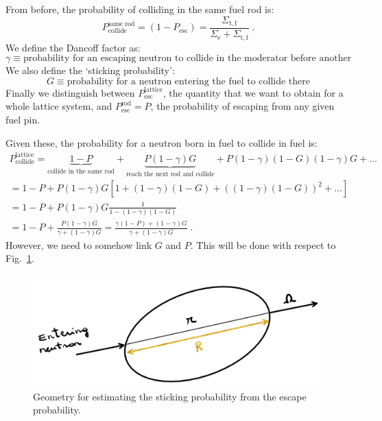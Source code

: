 From before, the probability of colliding in the same fuel rod is:
\begin{equation*}
    P^\text{same rod}_\mathrm{collide} = (1-P_\mathrm{esc}) = \frac{\Sigma_\mathrm{t,f}}{\Sigma_\mathrm{e} + \Sigma_\mathrm{t,f}}\;\mathrm{.}
\end{equation*}
We define the Dancoff factor as:
\begin{equation*}
    \gamma \equiv \text{probability for an escaping neutron to collide in the moderator before another fuel rod}
\end{equation*}
We also define the `sticking probability':
\begin{equation*}
    G \equiv \text{probability for a neutron entering the fuel to collide there}
\end{equation*}
Finally we distinguish between $P^\mathrm{lattice}_\mathrm{esc}$, the quantity that we want to obtain for a whole lattice system, and $P^\mathrm{rod}_\mathrm{esc} = P$, the probability of escaping from any given fuel pin.

Given these, the probability for a neutron born in fuel to collide in fuel is:
\begin{equation*}
\begin{split}
    P^\mathrm{lattice}_\mathrm{collide} = \underbrace{1-P}_{\text{collide in the same rod}} + \underbrace{P(1-\gamma)G}_{\text{reach the next rod and collide}} + P(1-\gamma)(1-G)(1-\gamma)G + ...\\
    = 1 - P + P(1-\gamma)G\left[1 + (1-\gamma)(1-G) + \left((1-\gamma)(1-G)\right)^2 + ...\right]\\
    = 1 - P + P(1-\gamma)G \frac{1}{1 - (1-\gamma)(1-G)} \\
    = 1-P + \frac{P(1-\gamma)G}{\gamma + (1-\gamma)G} = \frac{\gamma(1-P) + (1-\gamma)G}{\gamma + (1-\gamma)G}\;\mathrm{.}
    \end{split}
\end{equation*}
However, we need to somehow link $G$ and $P$. This will be done with respect to Fig.~\ref{fig:dancoff}.

\begin{figure}[h]
  \centering
  \includegraphics[scale=0.60]{./Figures/P6/dancoff.png} 
  \caption{Geometry for estimating the sticking probability from the escape probability.} 
  \label{fig:dancoff}
\end{figure}


